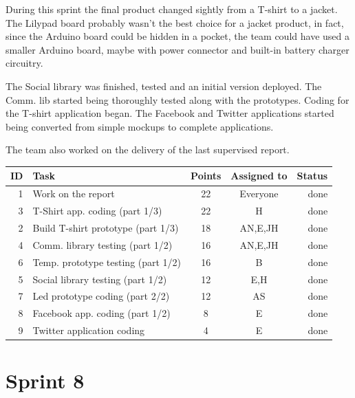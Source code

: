 During this sprint the final product changed sightly from a T-shirt to a jacket.
The Lilypad board probably wasn't the best choice for a jacket product, in fact,
since the Arduino board could be hidden in a pocket, the team could have used
a smaller Arduino board, maybe with power connector and built-in battery
charger circuitry.

The Social library was finished, tested and an initial version deployed.
The Comm. lib started being thoroughly tested along with the prototypes.
Coding for the T-shirt application began. The Facebook and Twitter applications
started being converted from simple mockups to complete applications.

The team also worked on the delivery of the last supervised report.

\begin{table}[ht!]
\begin{tabular}{ | r | l | c | c | r | }

\hline
\textbf{ID} & \textbf{Task} & \textbf{Points} & \textbf{Assigned to} & \textbf{Status} \\
\hline

1 & Work on the report							& 22 & Everyone		& done \\
\hline
3 & T-Shirt app. coding (part 1/3)				& 22 & H			& done \\
\hline
2 & Build T-shirt prototype (part 1/3)			& 18 & AN,E,JH		& done \\
\hline
4 & Comm. library testing (part 1/2)			& 16 & AN,E,JH		& done \\
\hline
6 & Temp. prototype testing (part 1/2)			& 16 & B			& done \\
\hline
5 & Social library testing (part 1/2)			& 12 & E,H			& done \\
\hline
7 & Led prototype coding (part 2/2)				& 12 & AS			& done \\
\hline
8 & Facebook app. coding (part 1/2)				& 8  & E			& done \\
\hline
9 & Twitter application coding					& 4  & E			& done \\
\hline

\end{tabular}
\end{table}

\newpage

\section{Sprint 8}

